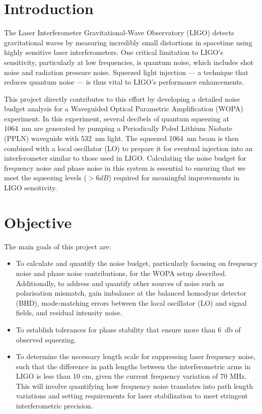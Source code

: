 \documentclass[colorlinks=true,pdfstartview=FitV,linkcolor=blue,
citecolor=red,urlcolor=magenta]{ligodoc}
\title{}
\author{}
\begin{document}
\tableofcontents

\newpage
\section{Introduction}
The Laser Interferometer Gravitational-Wave Observatory (LIGO) detects gravitational waves by measuring incredibly small distortions in spacetime using highly sensitive laser interferometers. One critical limitation to LIGO’s sensitivity, particularly at low frequencies, is quantum noise, which includes shot noise and radiation pressure noise. Squeezed light injection — a technique that reduces quantum noise — is thus vital to LIGO's performance enhancements.

This project directly contributes to this effort by developing a detailed noise budget analysis for a Waveguided Optical Parametric Amplification (WOPA) experiment. In this experiment, several decibels of quantum squeezing at \SI{1064}{\nano\meter} are generated by pumping a Periodically Poled Lithium Niobate (PPLN) waveguide with \SI{532}{\nano\meter} light. The squeezed \SI{1064}{\nano\meter} beam is then combined with a local oscillator (LO) to prepare it for eventual injection into an interferometer similar to those used in LIGO. Calculating the noise budget for frequency noise and phase noise in this system is essential to ensuring that we meet the squeezing levels ($> 6 dB$) required for meaningful improvements in LIGO sensitivity.

\section{Objective}
The main goals of this project are:

\begin{itemize}
    \item To calculate and quantify the noise budget, particularly focusing on frequency noise and phase noise contributions, for the WOPA setup described.  Additionally, to address and quantify other sources of noise such as polarisation mismatch, gain imbalance at the balanced homodyne detector (BHD), mode-matching errors between the local oscillator (LO) and signal fields, and residual intensity noise.
    \item To establish tolerances for phase stability that ensure more than \SI{6}{\decibel} of observed squeezing.
    \item To determine the necessary length scale for suppressing laser frequency noise, such that the difference in path lengths between the interferometric arms in LIGO is less than 10 cm, given the current frequency variation of 70 MHz. This will involve quantifying how frequency noise translates into path length variations and setting requirements for laser stabilization to meet stringent interferometric precision.
\end{itemize}
\end{document}
